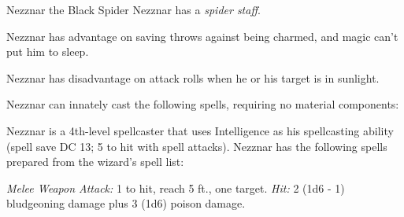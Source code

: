 \documentclass[10pt,a4paper,twoside,bg=print,twocolumn,openany,nodeprecatedcode]{dndbook}
\begin{document}
\begin{DndMonster}[float=t]{Nezznar the Black Spider}
\DndMonsterBasics[
armor-class = {11 (14 with \textit{mage armor})},
hit-points = {\DndDice{6d8}},
speed = {30 ft.}
]
\DndMonsterAbilityScores[
 str = 9,
 dex = 13,
 con = 10,
 int = 16,
 wis = 14,
 cha = 13
]
\DndMonsterDetails[
saving-throws = {Int +5, Wis +4},
skills = {Arcana +5, Perception +4, Stealth +3},
senses = {darkvision 120 ft., passive perception 14},
languages = {Elvish, Undercommon},
challenge = 2,
]
Nezznar has a \textit{spider staff}.

Nezznar has advantage on saving throws against being charmed, and magic can't put him to sleep.

Nezznar has disadvantage on attack rolls when he or his target is in sunlight.

Nezznar can innately cast the following spells, requiring no material components:
\begin{DndMonsterSpells}
\end{DndMonsterSpells}
Nezznar is a 4th-level spellcaster that uses Intelligence as his spellcasting ability (spell save DC 13; 5 to hit with spell attacks). Nezznar has the following spells prepared from the wizard's spell list:
\begin{DndMonsterSpells}
\end{DndMonsterSpells}
\textsl{Melee Weapon Attack:} 1 to hit, reach 5 ft., one target. \textsl{Hit:} 2 (1d6 - 1) bludgeoning damage plus 3 (1d6) poison damage.

\end{DndMonster}
\end{document}
